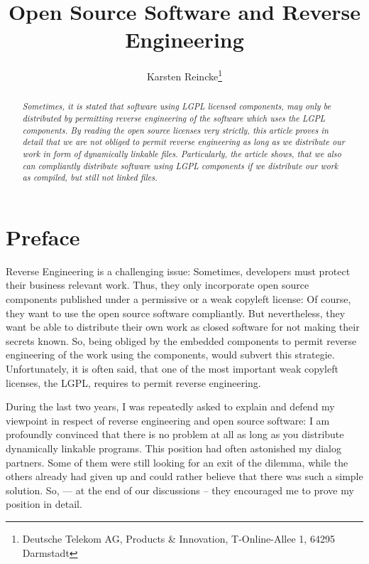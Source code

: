 \documentclass[DIV=calc,BCOR=5mm,12pt,headings=small,oneside,toc=bib]{scrartcl}
\begin{document}

\titlehead{Version 1.0}

\subject{\small \itshape How to Achieve Open Source License Compliance} 

\title{Open Source Software and Reverse Engineering}

\author{
Karsten Reincke\thanks{Deutsche Telekom AG, Products \& Innovation, 
T-Online-Allee 1, 64295 Darmstadt}
}

\maketitle

\normalsize

\begin{abstract}\noindent\emph{Sometimes, it is stated that software using LGPL
licensed components, may only be distributed by permitting reverse engineering
of the software which uses the LGPL components. By reading the open source
licenses very strictly, this article proves in detail that we are not obliged to
permit reverse engineering as long as we distribute our work in form of
dynamically linkable files. Particularly, the article shows, that we also can
compliantly distribute software using LGPL components if we distribute our work
as compiled, but still not linked files.}
\end{abstract}

\section{Preface}

Reverse Engineering is a challenging issue: Sometimes, developers must protect
their business relevant work. Thus, they only incorporate open source components
published under a permissive or a weak copyleft license: Of course, they want to
use the open source software compliantly. But nevertheless, they want be able to
distribute their own work as closed software for not making their secrets known.
So, being obliged by the embedded components to permit reverse engineering of
the work using the components, would subvert this strategie. Unfortunately, it
is often said, that one of the most important weak copyleft licenses, the LGPL,
requires to permit reverse engineering.

During the last two years, I was repeatedly asked to explain and defend my
viewpoint in respect of reverse engineering and open source software: I am
profoundly convinced that there is no problem at all as long as you distribute
dynamically linkable programs. This position had often astonished my dialog
partners. Some of them were still looking for an exit of the dilemma, while the
others already had given up and could rather believe that there was such a
simple solution. So, --- at the end of our discussions -- they encouraged me to
prove my position in detail.
\end{document}

